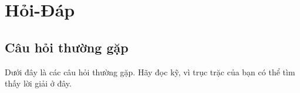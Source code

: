\section{\texorpdfstring{Hỏi-Đáp}{Hoi-Dap}}

\label{sec:questions}


\subsection{\texorpdfstring{Câu hỏi thường gặp}{Cau hoi thuong gap}}

\label{sec:FAQ}

Dưới đây là các câu hỏi thường gặp. Hãy đọc kỹ, vì trục trặc của bạn
có thể tìm thấy lời giải ở đây.
